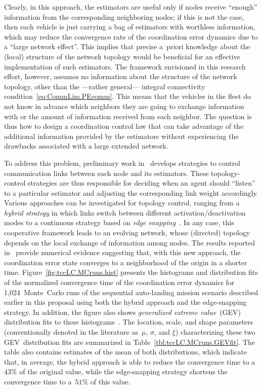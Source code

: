 \documentclass[letter,onecolumn,12pt]{aiaa-tc}
\newcommand{\1}{1_n}
\begin{document}
Clearly, in this approach, the estimators are useful only if nodes receive ``enough'' information from the corresponding neighboring nodes; if this is not the case, then each vehicle is just carrying a bag of estimators with worthless information, which may reduce the convergence rate of the coordination error dynamics due to a ``large network effect''. This implies that precise a~priori knowledge about the (local) structure of the network topology would be beneficial for an effective implementation of such estimators. The framework envisioned in this research effort, however, assumes no information about the structure of the network topology, other than the ---rather general--- integral connectivity condition~\eqref{eq:CommLim.PEcomm}. This means that the vehicles in the fleet do not know in advance which neighbors they are going to exchange information with or the amount of information received from each neighbor. The question is thus how to design a coordination control law that can take advantage of the additional information provided by the estimators without experiencing the drawbacks associated with a large extended network.


To address this problem, preliminary work in~\cite{XargayPhd} develops strategies to control communication links between each node and its estimators. These topology-control strategies are thus responsible for deciding when an agent should ``listen'' to a particular estimator and adjusting the corresponding link weight accordingly. Various approaches can be investigated for topology control, ranging from a \emph{hybrid strategy} in which links switch between different activation/deactivation modes to a continuous strategy based on \emph{edge snapping}~\cite{TCS10_DeLellis,CHAOS11_DeLellis}. In any case, this cooperative framework leads to an evolving network, whose (directed) topology depends on the local exchange of information among nodes. The results reported in~\cite{XargayPhd} provide numerical evidence suggesting that, with this new approach, the coordination error state converges to a neighborhood of the origin in a shorter time. Figure~\ref{fig:tccLC.MCruns.hist} presents the histograms and distribution fits of the normalized convergence time of the coordination error dynamics for 1,024~Monte~Carlo runs of the sequential auto-landing mission scenario described earlier in this proposal using both the hybrid approach and the edge-snapping strategy. In addition, the figure also shows \emph{generalized extreme value}~(GEV) distribution fits to these histograms~\cite{GEVbook}. The location, scale, and shape parameters (conventionally denoted in the literature as~$\mu$, $\sigma$, and $\xi$) characterizing these two GEV~distribution fits are summarized in Table~\ref{tbl:tccLC.MCruns.GEVfit}. The table also contains estimates of the mean of both distributions, which indicate that, in average, the hybrid approach is able to reduce the convergence time to a~$43\%$ of the original value, while the edge-snapping strategy shortens the convergence time to a~$51\%$ of this value.
\end{document}
